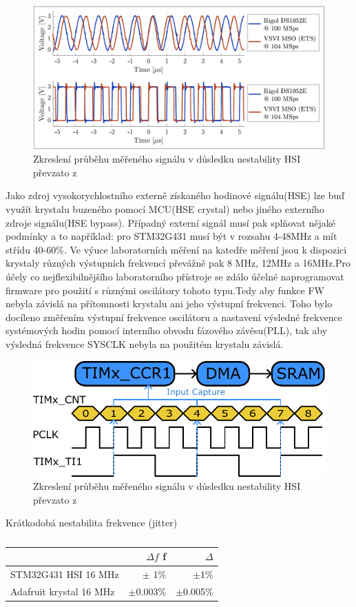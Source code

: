 \begin{figure}[H]
	\centering
	\includegraphics[width=0.7\linewidth]{Figs/Graphs/SignalDistortion_HSI}
	\caption{Zkreslení průběhu měřeného signálu v důsledku nestability HSI převzato z \cite{DujavaDIP}}
	\label{fig:signaldistortionhsi}
\end{figure}

Jako zdroj vysokorychlostního externě získaného hodinové signálu(HSE) lze buď využít krystalu buzeného pomocí MCU(HSE crystal) nebo jiného externího zdroje signálu(HSE bypass). Případný externí signál musí pak splňovat nějaké podmínky a to například: pro STM32G431 musí být v rozsahu 4-48MHz a mít střídu 40-60\%. Ve výuce laboratorních měření na katedře měření jsou k dispozici krystaly různých výstupních frekvencí převážně pak 8 MHz, 12MHz a 16MHz.Pro  účely co nejflexibilnějšího laboratorního přístroje se zdálo účelné naprogramovat firmware pro použití s různými  oscilátory tohoto typu.Tedy aby funkce FW nebyla závislá na přítomnosti krystalu ani jeho výstupní frekvenci. Toho bylo docíleno změřením výstupní frekvence oscilátoru a nastavení výsledné frekvence systémových hodin pomocí interního obvodu fázového závěsu(PLL), tak aby výsledná frekvence SYSCLK nebyla na použitém krystalu závislá.


\begin{figure}[H]
	\centering
	\includegraphics[width=0.7\linewidth]{Figs/Diagrams/SVG/InputCapturePeriodMeasure.pdf}
	\caption{Zkreslení průběhu měřeného signálu v důsledku nestability HSI převzato z \cite{DujavaDIP}}
	\label{fig:signaldistortionhsi}
\end{figure}

Krátkodobá nestabilita frekvence (jitter)
\begin{table}[H]
	\begin{tabular}{l|rr}
		& $\Delta f$ f & $\Delta$ \\ \hline
		STM32G431 HSI 16 MHz     & $\pm$ 1\%       & $\pm$1\%      \\ \hline
		Adafruit krystal 16 MHz & $\pm$0.003\%   & $\pm$0.005\% 
	\end{tabular}
	\caption{}
	\label{tab:HSE}
\end{table}

